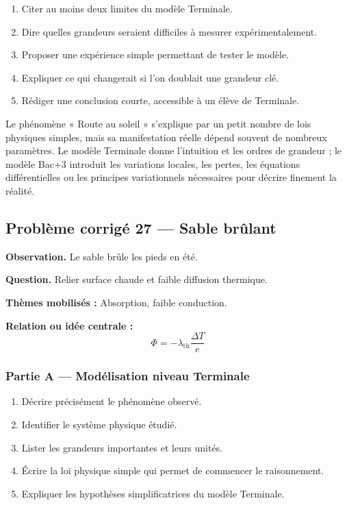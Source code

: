 \documentclass[11pt,a4paper]{article}
\begin{document}
\begin{enumerate}
  \item Citer au moins deux limites du modèle Terminale.
  \item Dire quelles grandeurs seraient difficiles à mesurer expérimentalement.
  \item Proposer une expérience simple permettant de tester le modèle.
  \item Expliquer ce qui changerait si l'on doublait une grandeur clé.
  \item Rédiger une conclusion courte, accessible à un élève de Terminale.
\end{enumerate}

\begin{corrigebox}
Le phénomène « Route au soleil » s'explique par un petit nombre de lois physiques simples, mais sa manifestation réelle dépend souvent de nombreux paramètres. Le modèle Terminale donne l'intuition et les ordres de grandeur ; le modèle Bac+3 introduit les variations locales, les pertes, les équations différentielles ou les principes variationnels nécessaires pour décrire finement la réalité.
\end{corrigebox}

\subsection{Problème corrigé 27 — Sable brûlant}

\begin{exercicebox}
\textbf{Observation.} Le sable brûle les pieds en été.

\medskip
\textbf{Question.} Relier surface chaude et faible diffusion thermique.

\medskip
\textbf{Thèmes mobilisés :} Absorption, faible conduction.

\medskip
\textbf{Relation ou idée centrale :}
\[
\Phi=-\lambda_{\mathrm{th}}\frac{\Delta T}{e}
\]
\end{exercicebox}

\subsubsection*{Partie A — Modélisation niveau Terminale}

\begin{enumerate}
  \item Décrire précisément le phénomène observé.
  \item Identifier le système physique étudié.
  \item Lister les grandeurs importantes et leurs unités.
  \item Écrire la loi physique simple qui permet de commencer le raisonnement.
  \item Expliquer les hypothèses simplificatrices du modèle Terminale.
\end{enumerate}
\end{document}
